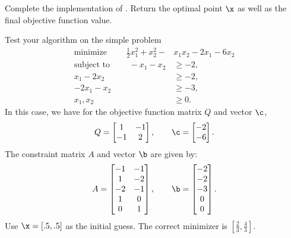 \begin{problem}
Complete the implementation of .
Return the optimal point $\x$ as well as the final objective function value.

Test your algorithm on the simple problem
\begin{align*}
\text{minimize }\qquad \frac{1}{2}x_1^2 + x_2^2 - &x_1x_2 - 2x_1 - 6x_2\\
\text{subject to }\qquad
-x_1-x_2 &\geq -2,\\
x_1-2x_2 &\geq -2,\\
-2x_1-x_2&\geq -3,\\
x_1, x_2 &\geq 0.
\end{align*}
In this case, we have for the objective function matrix $Q$ and vector $\c$,
\[
Q = \begin{bmatrix}
1 & -1\\
-1 & 2
\end{bmatrix},
\qquad
\c = \begin{bmatrix}
-2\\
-6
\end{bmatrix}.
\]
The constraint matrix $A$ and vector $\b$ are given by:
\[
A = \begin{bmatrix}
-1 & -1\\
1 & -2\\
-2 & -1\\
1 & 0\\
0 & 1
\end{bmatrix},
\qquad
\b = \begin{bmatrix}
-2\\
-2\\
-3\\
0\\
0
\end{bmatrix}.
\]
Use $\x = [.5, .5]$ as the initial guess.
The correct minimizer is $\left[\frac{2}{3}, \frac{4}{3}\right].$
\end{problem}

